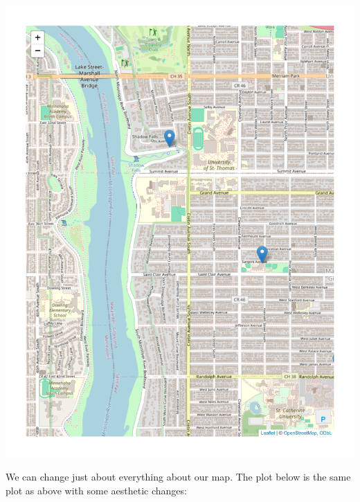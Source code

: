 \documentclass[
  letterpaper,
  DIV=11,
  numbers=noendperiod]{scrreprt}
\begin{document}
\includegraphics{src/06-Spatial_Viz_files/figure-pdf/unnamed-chunk-24-1.pdf}

We can change just about everything about our map. The plot below is the
same plot as above with some aesthetic changes:
\end{document}
